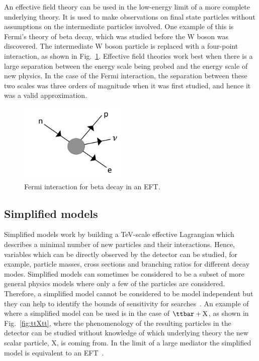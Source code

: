 An effective field theory can be used in the low-energy limit of a more complete underlying theory. It is used to make observations on final state particles without assumptions on the intermediate particles involved. One example of this is Fermi's theory of beta decay, which was studied before the W boson was discovered. The intermediate W boson particle is replaced with a four-point interaction, as shown in Fig.~\ref{fig:eft1}. Effective field theories work best when there is a large separation between the energy scale being probed and the energy scale of new physics. In the case of the Fermi interaction, the separation between these two scales was three orders of magnitude when it was first studied, and hence it was a valid approximation. 
\begin{figure}[ht!]
\centering
    \includegraphics[width=0.45\textwidth]{images/Theory/betadecay.pdf}
    \caption{Fermi interaction for beta decay in an EFT.}
    \label{fig:eft1}
\end{figure}

\subsection{Simplified models}

Simplified models work by building a TeV-scale effective Lagrangian which describes a minimal number of new particles and their interactions. Hence, variables which can be directly observed by the detector can be studied, for example, particle masses, cross sections and branching ratios for different decay modes. Simplified models can sometimes be considered to be a subset of more general physics models where only a few of the particles are considered. Therefore, a simplified model cannot be considered to be model independent but they can help to identify the bounds of sensitivity for searches~\cite{0954-3899-39-10-105005}. An example of where a simplified model can be used is in the case of $\ttbar+\textrm{X}$, as shown in Fig.~\ref{fig:ttXtt}, where the phenomenology of the resulting particles in the detector can be studied without knowledge of which underlying theory the new scalar particle, X, is coming from. In the limit of a large mediator the simplified model is equivalent to an EFT~\cite{DeSimone:2016fbz}.\\

